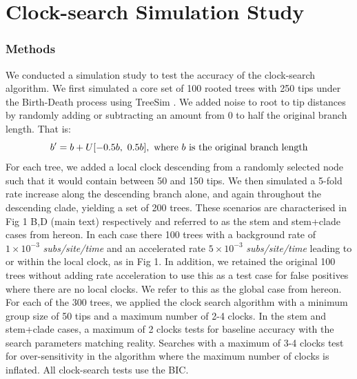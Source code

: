 \documentclass{article}
\begin{document}
\section{{Clock-search Simulation Study}}
\subsubsection*{Methods}
We conducted a simulation study to test the accuracy of the clock-search algorithm. {We first simulated a core set of 100 rooted trees with 250 tips under the Birth-Death process using TreeSim \citep{stadler_2011_simulating}. We added noise to root to tip distances by randomly adding or subtracting an amount from 0 to half the original branch length. That is:
\begin{equation*}
    b^{\prime}= b + U[-0.5b,~0.5b],~\textnormal{where $b$ is the original branch length}
\end{equation*}
For each tree, we added a local clock descending from a randomly selected node such that it would contain between 50 and 150 tips. We then simulated a 5-fold rate increase along the descending branch alone, and again throughout the descending clade, yielding a set of 200 trees. These scenarios are characterised in Fig 1 B,D (main text) respectively and referred to as the stem and stem+clade cases from hereon. In each case there 100 trees with a background rate of $1\times10^{-3}$ \textit{subs/site/time} and an accelerated rate $5\times10^{-3}$ \textit{subs/site/time} leading to or within the local clock, as in Fig 1. In addition, we retained the original 100 trees without adding rate acceleration to use this as a test case for false positives where there are no local clocks. We refer to this as the global case  from hereon. For each of the 300 trees, we applied the clock search algorithm with a minimum group size of 50 tips and a maximum number of 2-4 clocks. In the stem and stem+clade cases, a maximum of 2 clocks tests for baseline accuracy with the search parameters matching reality.} Searches with a maximum of 3-4 clocks test for over-sensitivity in the algorithm where the maximum number of clocks is inflated. All clock-search tests use the BIC.
\end{document}
